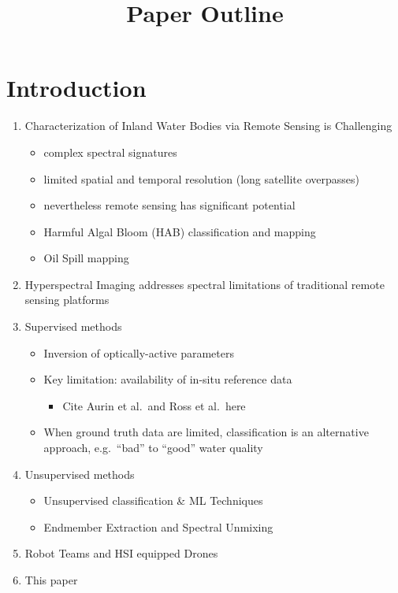 \documentclass[
  letterpaper,
  DIV=11,
  numbers=noendperiod]{scrartcl}
\title{Paper Outline}
\author{}
\date{}
\providecommand{\tightlist}{%
  \setlength{\itemsep}{0pt}\setlength{\parskip}{0pt}}\usepackage{longtable,booktabs,array}
\begin{document}
\maketitle

\section{Introduction}\label{introduction}

\begin{enumerate}
\def\labelenumi{\arabic{enumi}.}
\item
  Characterization of Inland Water Bodies via Remote Sensing is
  Challenging

  \begin{itemize}
  \tightlist
  \item
    complex spectral signatures
  \item
    limited spatial and temporal resolution (long satellite overpasses)
  \item
    nevertheless remote sensing has significant potential
  \item
    Harmful Algal Bloom (HAB) classification and mapping
  \item
    Oil Spill mapping
  \end{itemize}
\item
  Hyperspectral Imaging addresses spectral limitations of traditional
  remote sensing platforms
\item
  Supervised methods

  \begin{itemize}
  \tightlist
  \item
    Inversion of optically-active parameters
  \item
    Key limitation: availability of in-situ reference data

    \begin{itemize}
    \tightlist
    \item
      Cite Aurin et al.~and Ross et al.~here
    \end{itemize}
  \item
    When ground truth data are limited, classification is an alternative
    approach, e.g.~``bad'' to ``good'' water quality
  \end{itemize}
\item
  Unsupervised methods

  \begin{itemize}
  \tightlist
  \item
    Unsupervised classification \& ML Techniques
  \item
    Endmember Extraction and Spectral Unmixing
  \end{itemize}
\item
  Robot Teams and HSI equipped Drones
\item
  This paper


\end{enumerate}
\end{document}
